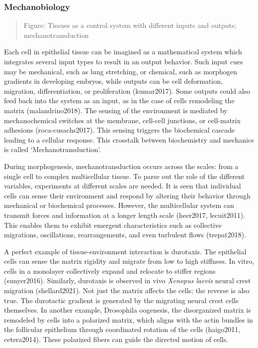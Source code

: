 \documentclass[
]{article}
\begin{document}
\hypertarget{mechanobiology}{%
\subsubsection{Mechanobiology}\label{mechanobiology}}

\begin{quote}
Figure: Tissues as a control system with different inputs and outputs;
mechanotransduction
\end{quote}

Each cell in epithelial tissue can be imagined as a mathematical system
which integrates several input types to result in an output behavior.
Such input cues may be mechanical, such as lung stretching, or chemical,
such as morphogen gradients in developing embryos, while outputs can be
cell deformation, migration, differentiation, or proliferation
(kumar2017). Some outputs could also feed back into the system as an
input, as in the case of cells remodeling the matrix (malandrino2018).
The sensing of the environment is mediated by mechanochemical switches
at the membrane, cell-cell junctions, or cell-matrix adhesions
(roca-cusachs2017). This sensing triggers the biochemical cascade
leading to a cellular response. This crosstalk between biochemistry and
mechanics is called `Mechanotransduction'.

During morphogenesis, mechanotransduction occurs across the scales: from
a single cell to complex multicellular tissue. To parse out the role of
the different variables, experiments at different scales are needed. It
is seen that individual cells can sense their environment and respond by
altering their behavior through mechanical or biochemical processes.
However, the multicellular system can transmit forces and information at
a longer length scale (heer2017, lecuit2011). This enables them to
exhibit emergent characteristics such as collective migrations,
oscillations, rearrangements, and even turbulent flows (trepat2018).

A perfect example of tissue-environment interaction is durotaxis. The
epithelial cells can sense the matrix rigidity and migrate from low to
high stiffness. In vitro, cells in a monolayer collectively expand and
relocate to stiffer regions (sunyer2016). Similarly, durotaxis is
observed in vivo \emph{Xenopus laevis} neural crest migration
(shellard2021). Not just the matrix affects the cells; the reverse is
also true. The durotactic gradient is generated by the migrating neural
crest cells themselves. In another example, Drosophila oogenesis, the
disorganized matrix is remodeled by cells into a polarized matrix, which
aligns with the actin bundles in the follicular epithelium through
coordinated rotation of the cells (haigo2011, cetera2014). These
polarized fibers can guide the directed motion of cells.
\end{document}

